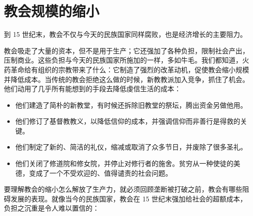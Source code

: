 \section{教会规模的缩小}
到 15 世纪末，教会不仅与今天的民族国家同样腐败，也是经济增长的主要阻力。

教会吸走了大量的资本，但不是用于生产；它还强加了各种负担，限制社会产出，压制商业。这些负担与今天的民族国家所施加的一样，多如牛毛。我们都知道，火药革命给有组织的宗教带来了什么：它制造了强烈的改革动机，促使教会缩小规模并降低成本。当传统的教会拒绝这么做的时候，新教教派加入竞争，抓住了机会。他们动用了几乎所有能想到的手段去降低虔信生活的成本：

\begin{itemize}
    \item 他们建造了简朴的新教堂，有时候还拆除旧教堂的祭坛，腾出资金另做他用。
    \item 他们修订了基督教教义，以降低信仰的成本，并强调信仰而非善行是得救的关键。
    \item 他们制定了新的、简洁的礼仪，缩减或取消了众多节日，并废除了很多圣礼。
    \item 他们关闭了修道院和修女院，并停止对修行者的施舍。贫穷从一种使徒的美德，变成了一个不受欢迎的、值得谴责的社会问题。
\end{itemize}

要理解教会的缩小怎么解放了生产力，就必须回顾垄断被打破之前，教会有哪些阻碍发展的表现。就像当今的民族国家，教会在 15 世纪末强加给社会的超额成本，负担之沉重是令人难以置信的：

